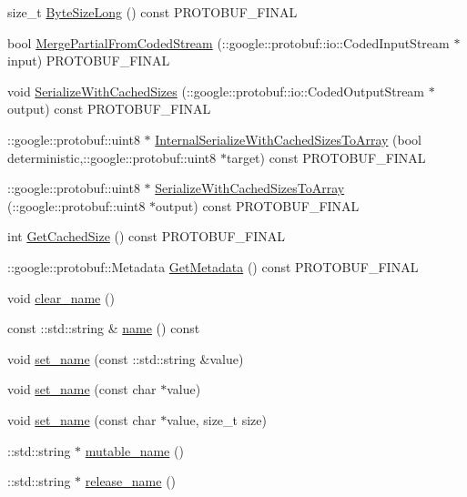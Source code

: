 \begin{DoxyCompactItemize}
size\+\_\+t \hyperlink{class_hello_a5e4c274ae3c79f7c33de700ea8768858}{Byte\+Size\+Long} () const P\+R\+O\+T\+O\+B\+U\+F\+\_\+\+F\+I\+N\+AL
\item 
bool \hyperlink{class_hello_ad0bd81e48fec2eb77618cbc0489ddd9e}{Merge\+Partial\+From\+Coded\+Stream} (\+::google\+::protobuf\+::io\+::\+Coded\+Input\+Stream $\ast$input) P\+R\+O\+T\+O\+B\+U\+F\+\_\+\+F\+I\+N\+AL
\item 
void \hyperlink{class_hello_ac92291e781c2c1edde2a3c3e059bfc95}{Serialize\+With\+Cached\+Sizes} (\+::google\+::protobuf\+::io\+::\+Coded\+Output\+Stream $\ast$output) const P\+R\+O\+T\+O\+B\+U\+F\+\_\+\+F\+I\+N\+AL
\item 
\+::google\+::protobuf\+::uint8 $\ast$ \hyperlink{class_hello_aa016d3f9806dfe20be84701c1745a7e5}{Internal\+Serialize\+With\+Cached\+Sizes\+To\+Array} (bool deterministic,\+::google\+::protobuf\+::uint8 $\ast$target) const P\+R\+O\+T\+O\+B\+U\+F\+\_\+\+F\+I\+N\+AL
\item 
\+::google\+::protobuf\+::uint8 $\ast$ \hyperlink{class_hello_a9b1046d7f5b650208713576e1736426f}{Serialize\+With\+Cached\+Sizes\+To\+Array} (\+::google\+::protobuf\+::uint8 $\ast$output) const P\+R\+O\+T\+O\+B\+U\+F\+\_\+\+F\+I\+N\+AL
\item 
int \hyperlink{class_hello_a443d7e919fb01afbf7085482348434f1}{Get\+Cached\+Size} () const P\+R\+O\+T\+O\+B\+U\+F\+\_\+\+F\+I\+N\+AL
\item 
\+::google\+::protobuf\+::\+Metadata \hyperlink{class_hello_af317fbebedc25e52461c38d70433814b}{Get\+Metadata} () const P\+R\+O\+T\+O\+B\+U\+F\+\_\+\+F\+I\+N\+AL
\item 
void \hyperlink{class_hello_a36384a292c19f4288029257f290c8d5f}{clear\+\_\+name} ()
\item 
const \+::std\+::string \& \hyperlink{class_hello_ae6a444f29e20e73dbbf2c4216afe12d7}{name} () const 
\item 
void \hyperlink{class_hello_a3b00bde5bbe70e04b708d9fb9b90d3bb}{set\+\_\+name} (const \+::std\+::string \&value)
\item 
void \hyperlink{class_hello_a8015b502b29b0203ab226e92f5ca5faa}{set\+\_\+name} (const char $\ast$value)
\item 
void \hyperlink{class_hello_aa2e6fe41a1d576276b955c1d5df5fe92}{set\+\_\+name} (const char $\ast$value, size\+\_\+t size)
\item 
\+::std\+::string $\ast$ \hyperlink{class_hello_af7a7aa03f2905855c7d7e226f67cff07}{mutable\+\_\+name} ()
\item 
\+::std\+::string $\ast$ \hyperlink{class_hello_a76214ca65d1a26c9291fdf1bc3fc55ec}{release\+\_\+name} ()

\end{DoxyCompactItemize}
